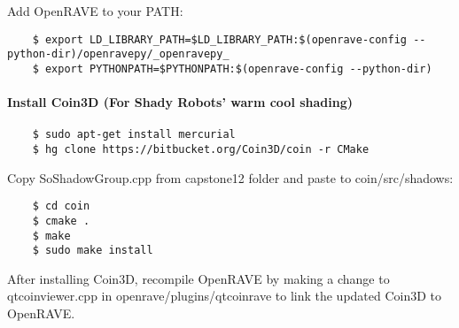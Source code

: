 Add OpenRAVE to your PATH:
\begin{lstlisting}
    $ export LD_LIBRARY_PATH=$LD_LIBRARY_PATH:$(openrave-config --python-dir)/openravepy/_openravepy_
    $ export PYTHONPATH=$PYTHONPATH:$(openrave-config --python-dir)
\end{lstlisting}

\paragraph{Install Coin3D (For Shady Robots' warm cool shading)}
\begin{lstlisting}
    $ sudo apt-get install mercurial
    $ hg clone https://bitbucket.org/Coin3D/coin -r CMake
\end{lstlisting}

Copy SoShadowGroup.cpp from capstone12 folder and paste to coin/src/shadows:

\begin{lstlisting}
    $ cd coin
    $ cmake .
    $ make
    $ sudo make install
\end{lstlisting}

After installing Coin3D, recompile OpenRAVE by making a change to qtcoinviewer.cpp in openrave/plugins/qtcoinrave to link the updated Coin3D to OpenRAVE.